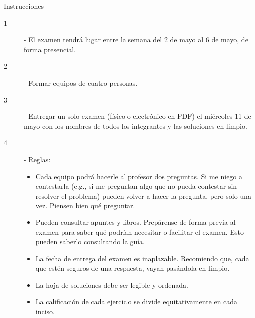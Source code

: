 \documentclass[12pt]{scrartcl} %
\begin{document}
\begin{summarybox}{Instrucciones}
\begin{description}
      \item[1] - El examen tendrá lugar entre la semana del 2 de mayo al 6 de mayo, de forma presencial.
      \item[2] - Formar equipos de cuatro personas. 
      \item[3] - Entregar un solo examen (físico o electrónico en PDF) el miércoles 11 de mayo con los nombres de todos los integrantes y las soluciones en limpio. 
      \item[4] - Reglas:
     \begin{itemize}
       \setlength{\itemsep}{0pt}
       \setlength{\parskip}{0pt}
       \setlength{\parsep}{0pt}
       \item Cada equipo podrá hacerle al profesor dos preguntas. Si me niego a contestarla (e.g., si me preguntan algo que no pueda contestar sin resolver el problema) pueden volver a hacer la pregunta, pero solo una vez. Piensen bien qué preguntar.
       \item Pueden consultar apuntes y libros. Prepárense de forma previa al examen para saber qué podrían necesitar o facilitar el examen. Esto pueden saberlo consultando la guía. 
       \item La fecha de entrega del examen es inaplazable. Recomiendo que, cada que estén seguros de una respuesta, vayan pasándola en limpio.
       \item La hoja de soluciones debe ser legible y ordenada.
       \item La calificación de cada ejercicio se divide equitativamente en cada inciso.
     \end{itemize}   
      
    \end{description}

\end{summarybox}

\begin{center}
  \Coffeecup[1.5]
\end{center}

\newpage
\end{document}
